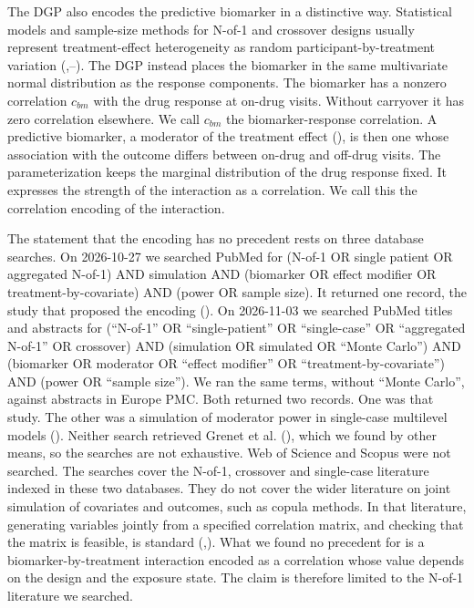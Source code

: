 \documentclass[
  11pt,
]{article}
\begin{document}
The DGP also encodes the predictive biomarker in a distinctive way.
Statistical models and sample-size methods for N-of-1 and crossover
designs usually represent treatment-effect heterogeneity as random
participant-by-treatment variation
(,--).
The DGP instead places the biomarker in the same multivariate
normal distribution as the response components. The biomarker has a
nonzero correlation \(c_{bm}\) with the drug response at on-drug visits.
Without carryover it has zero correlation elsewhere. We call \(c_{bm}\)
the biomarker-response correlation. A predictive biomarker, a
moderator of the treatment effect (), is then
one whose association with the outcome differs between on-drug and
off-drug visits. The parameterization keeps the marginal distribution
of the drug response fixed. It expresses the strength of the
interaction as a correlation. We call this the correlation encoding of
the interaction.

The statement that the encoding has no precedent rests on three
database searches. On 2026-10-27 we searched PubMed for (N-of-1 OR
single patient OR aggregated N-of-1) AND simulation AND (biomarker OR
effect modifier OR treatment-by-covariate) AND (power OR sample size).
It returned one record, the study that proposed the encoding
(). On 2026-11-03 we searched
PubMed titles and abstracts for (``N-of-1'' OR ``single-patient'' OR
``single-case'' OR ``aggregated N-of-1'' OR crossover) AND (simulation OR
simulated OR ``Monte Carlo'') AND (biomarker OR moderator OR ``effect
modifier'' OR ``treatment-by-covariate'') AND (power OR ``sample size'').
We ran the same terms, without ``Monte Carlo'', against abstracts in
Europe PMC. Both returned two records. One was that study. The other
was a simulation of moderator power in single-case multilevel models
(). Neither search retrieved Grenet et al.
(), which we found by other means, so the searches are not
exhaustive. Web of Science and Scopus were not searched.
The searches cover the N-of-1, crossover and single-case literature
indexed in these two databases. They do not cover the wider
literature on joint simulation of covariates and outcomes, such as
copula methods. In that literature, generating variables jointly from
a specified correlation matrix, and checking that the matrix is
feasible, is standard (,). What we
found no precedent for is a biomarker-by-treatment interaction encoded
as a correlation whose value depends on the design and the exposure
state. The claim is therefore limited to the N-of-1 literature we
searched.
\end{document}
